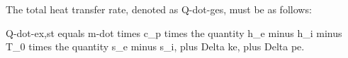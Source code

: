The total heat transfer rate, denoted as Q-dot-ges, must be as follows:

Q-dot-ex,st equals m-dot times c_p times the quantity h_e minus h_i minus T_0 times the quantity s_e minus s_i, plus Delta ke, plus Delta pe.